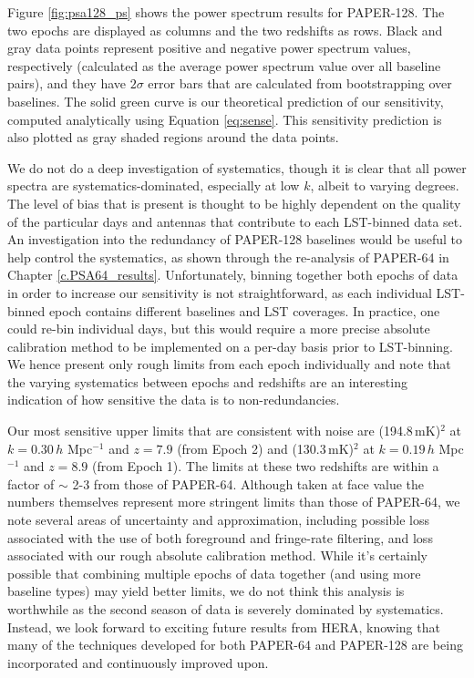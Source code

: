 Figure \ref{fig:psa128_ps} shows the power spectrum results for PAPER-128. The two epochs are displayed as columns and the two redshifts as rows. Black and gray data points represent positive and negative power spectrum values, respectively (calculated as the average power spectrum value over all baseline pairs), and they have $2\sigma$ error bars that are calculated from bootstrapping over baselines. The solid green curve is our theoretical prediction of our sensitivity, computed analytically using Equation \eqref{eq:sense}. This sensitivity prediction is also plotted as gray shaded regions around the data points.

We do not do a deep investigation of systematics, though it is clear that all power spectra are systematics-dominated, especially at low $k$, albeit to varying degrees. The level of bias that is present is thought to be highly dependent on the quality of the particular days and antennas that contribute to each LST-binned data set. An investigation into the redundancy of PAPER-128 baselines would be useful to help control the systematics, as shown through the re-analysis of PAPER-64 in Chapter \ref{c.PSA64_results}. Unfortunately, binning together both epochs of data in order to increase our sensitivity is not straightforward, as each individual LST-binned epoch contains different baselines and LST coverages. In practice, one could re-bin individual days, but this would require a more precise absolute calibration method to be implemented on a per-day basis prior to LST-binning. We hence present only rough limits from each epoch individually and note that the varying systematics between epochs and redshifts are an interesting indication of how sensitive the data is to non-redundancies.

Our most sensitive upper limits that are consistent with noise are (194.8\,mK)$^{2}$ at $k = 0.30\,h$ Mpc$^{-1}$ and $z=7.9$ (from Epoch 2) and (130.3\,mK)$^{2}$ at $k = 0.19\,h$ Mpc$^{-1}$ and $z=8.9$ (from Epoch 1). The limits at these two redshifts are within a factor of $\sim$ 2-3 from those of PAPER-64. Although taken at face value the numbers themselves represent more stringent limits than those of PAPER-64, we note several areas of uncertainty and approximation, including possible loss associated with the use of both foreground and fringe-rate filtering, and loss associated with our rough absolute calibration method. While it's certainly possible that combining multiple epochs of data together (and using more baseline types) may yield better limits, we do not think this analysis is worthwhile as the second season of data is severely dominated by systematics. Instead, we look forward to exciting future results from HERA, knowing that many of the techniques developed for both PAPER-64 and PAPER-128 are being incorporated and continuously improved upon.

